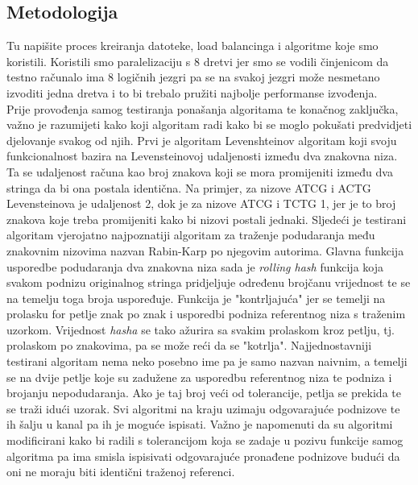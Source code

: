 \documentclass[conference]{IEEEtran}
\begin{document}
\subsection{Metodologija}
Tu napišite proces kreiranja datoteke, load balancinga i algoritme koje smo koristili.
Koristili smo paralelizaciju s 8 dretvi jer smo se vodili činjenicom da testno računalo ima 8 logičnih jezgri pa se na svakoj jezgri može nesmetano izvoditi jedna dretva i to bi trebalo pružiti najbolje performanse izvođenja.\\
Prije provođenja samog testiranja ponašanja algoritama te konačnog zaključka, važno je razumijeti kako koji algoritam radi kako bi se moglo pokušati predvidjeti djelovanje svakog od njih. Prvi je algoritam Levenshteinov algoritam koji svoju funkcionalnost bazira na Levensteinovoj udaljenosti između dva znakovna niza. Ta se udaljenost računa kao broj znakova koji se mora promijeniti između dva stringa da bi ona postala identična. Na primjer, za nizove ATCG i ACTG Levensteinova je udaljenost 2, dok je za nizove ATCG i TCTG 1, jer je to broj znakova koje treba promijeniti kako bi nizovi postali jednaki. Sljedeći je testirani algoritam vjerojatno najpoznatiji algoritam za traženje podudaranja među znakovnim nizovima nazvan Rabin-Karp po njegovim autorima. Glavna funkcija usporedbe podudaranja dva znakovna niza sada je \textit{rolling hash} funkcija koja svakom podnizu originalnog stringa pridjeljuje određenu brojčanu vrijednost te se na temelju toga broja uspoređuje. Funkcija je "kontrljajuća" jer se temelji na prolasku for petlje znak po znak i usporedbi podniza referentnog niza s traženim uzorkom. Vrijednost \textit{hasha} se tako ažurira sa svakim prolaskom kroz petlju, tj. prolaskom po znakovima, pa se može reći da se "kotrlja". Najjednostavniji testirani algoritam nema neko posebno ime pa je samo nazvan naivnim, a temelji se na dvije petlje koje su zadužene za usporedbu referentnog niza te podniza i brojanju nepodudaranja. Ako je taj broj veći od tolerancije, petlja se prekida te se traži idući uzorak.
Svi algoritmi na kraju uzimaju odgovarajuće podnizove te ih šalju u kanal pa ih je moguće ispisati. Važno je napomenuti da su algoritmi modificirani kako bi radili s tolerancijom koja se zadaje u pozivu funkcije samog algoritma pa ima smisla ispisivati odgovarajuće pronađene podnizove budući da oni ne moraju biti identični traženoj referenci.
\end{document}

